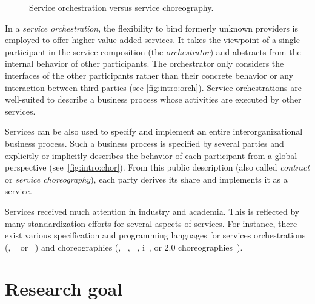 \begin{figure}
\centering
\hfill
{}\hfill
{} \hfill${}$
\caption{Service orchestration versus service choreography.}
\end{figure}

In a \emph{service orchestration}, the flexibility to bind formerly unknown providers is employed to offer higher-value added services. It takes the viewpoint of a single participant in the service composition (the \emph{orchestrator}) and abstracts from the internal behavior of other participants. The orchestrator only considers the interfaces of the other participants rather than their concrete behavior or any interaction between third parties (see \autoref{fig:intro:orch}). Service orchestrations are well-suited to describe a business process whose activities are executed by other services.

Services can be also used to specify and implement an entire interorganizational business process. Such a business process is specified by several parties and explicitly or implicitly describes the behavior of each participant from a global perspective (see~\autoref{fig:intro:chor}). From this public description (also called \emph{contract} or \emph{service choreography}), each party derives its share and implements it as a service.

Services received much attention in industry and academia. This is reflected by many standardization efforts for several aspects of services. For instance, there exist various specification and programming languages for services orchestrations (\eg, ~\cite{standard_bpel} or ~\cite{standard_bpmn}) and choreographies (\eg, \bpelchor~\cite{DeckerKLW_2007_icws}, ~\cite{standard_wsdl}, i~\cite{DeckerB_2007_bpmw}, or  2.0 choreographies~\cite{standard_bpmn2}).





\section{Research goal}

